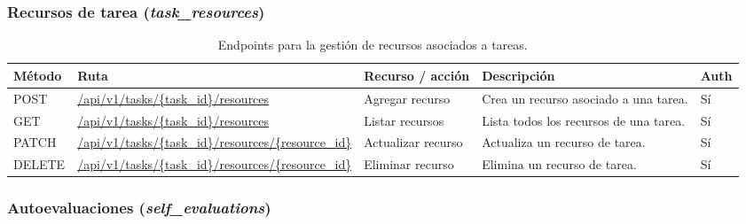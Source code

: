 \subsubsection*{Recursos de tarea (\textit{task\_resources})}

\begin{table}[H]
\centering
\footnotesize
\setlength{\tabcolsep}{4pt}
\renewcommand{\arraystretch}{1.25}
\begin{tabular}{|p{1.4cm}|p{4.1cm}|p{3.2cm}|p{5.8cm}|p{1cm}|}
\hline
\textbf{Método} & \textbf{Ruta} & \textbf{Recurso / acción} & \textbf{Descripción} & \textbf{Auth} \\
\hline

POST & \url{/api/v1/tasks/{task\_id}/resources} & Agregar recurso &
Crea un recurso asociado a una tarea. &
Sí \\
\hline

GET & \url{/api/v1/tasks/{task\_id}/resources} & Listar recursos &
Lista todos los recursos de una tarea. &
Sí \\
\hline

PATCH & \url{/api/v1/tasks/{task\_id}/resources/{resource\_id}} & Actualizar recurso &
Actualiza un recurso de tarea. &
Sí \\
\hline

DELETE & \url{/api/v1/tasks/{task\_id}/resources/{resource\_id}} & Eliminar recurso &
Elimina un recurso de tarea. &
Sí \\
\hline

\end{tabular}
\caption{Endpoints para la gestión de recursos asociados a tareas.}
\end{table}

\subsubsection*{Autoevaluaciones (\textit{self\_evaluations})}

